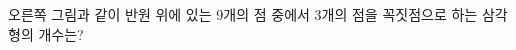 \noindent\begin{minipage}[t]{0.58\linewidth}\vspace{0pt}\raggedright 오른쪽 그림과 같이 반원 위에 있는 9개의 점 중에서 3개의 점을 꼭짓점으로 하는 삼각형의 개수는?\end{minipage}\hfill\begin{minipage}[t]{0.4\linewidth}\vspace{0pt}\centering \resizebox{\ifdim\width>\linewidth\linewidth\else\width\fi}{!}{}\end{minipage}\par
{}
